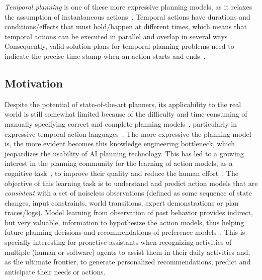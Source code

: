 \documentclass[10pt,journal,compsoc]{IEEEtran}
\begin{document}
{\em Temporal planning} is one of these more expressive planning models, as it relaxes the assumption of instantaneous actions~\cite{fox2003pddl2}. Temporal actions have durations and conditions/effects that must hold/happen at different times, which means that temporal actions can be executed in parallel and overlap in several ways~\cite{cushing2007temporal}. Consequently, valid solution plans for temporal planning problems need to indicate the precise time-stamp when an action starts and ends~\cite{howey2004val}.

\subsection{Motivation}

Despite the potential of state-of-the-art planners, its applicability to the real world is still somewhat limited because of the difficulty and time-consuming of manually specifying correct and complete planning models~\cite{kambhampati2007model,ZhuoYHL10}, particularly in expressive temporal action languages~\cite{cushing2007temporal}. The more expressive the planning model is, the more evident becomes this knowledge engineering bottleneck, which jeopardizes the usability of AI planning technology. This has led to a growing interest in the planning community for the learning of action models, as a cognitive task~\cite{Baker2009}, to improve their quality and reduce the human effort~\cite{jimenez2012review,ZhuoYHL10}. 
The objective of this learning task is to understand and predict action models
that are {\em consistent} with a set of noiseless observations (defined as some sequence of state changes, input constraints, world transitions, expert demonstrations or plan traces/logs). Model learning from observation of past behavior provides indirect, but very valuable, information to hypothesize the action models, thus helping future planning decisions and recommendations of preference models~\cite{Aggarwal2016}. This is specially interesting for proactive assistants when recognizing activities of multiple (human or software) agents to assist them in their daily activities and, as the ultimate frontier, to generate personalized recommendations, predict and anticipate their needs or actions.
\end{document}
